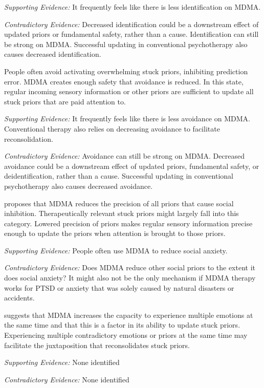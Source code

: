 \documentclass[11pt,oneside]{book}
\begin{document}
\begin{description}
    \textit{Supporting Evidence:} It frequently feels like there is less identification on MDMA.

    \textit{Contradictory Evidence:} Decreased identification could be a downstream effect of updated priors or fundamental safety, rather than a cause. Identification can still be strong on MDMA. Successful updating in conventional psychotherapy also causes decreased identification.

    \item[Decreased Avoidance of Activating Stuck Priors] People often avoid activating overwhelming stuck priors, inhibiting prediction error. MDMA creates enough safety that avoidance is reduced. In this state, regular incoming sensory information or other priors are sufficient to update all stuck priors that are paid attention to.
    
    \textit{Supporting Evidence:} It frequently feels like there is less avoidance on MDMA. Conventional therapy also relies on decreasing avoidance to facilitate reconsolidation.

    \textit{Contradictory Evidence:} Avoidance can still be strong on MDMA. Decreased avoidance could be a downstream effect of updated priors, fundamental safety, or deidentification, rather than a cause. Successful updating in conventional psychotherapy also causes decreased avoidance.

    \item[Reduced Precision of Social/Relational Priors] \textcite{carhart2019rebus} proposes that MDMA reduces the precision of all priors that cause social inhibition. Therapeutically relevant stuck priors might largely fall into this category. Lowered precision of priors makes regular sensory information precise enough to update the priors when attention is brought to those priors.
    
    \textit{Supporting Evidence:} People often use MDMA to reduce social anxiety.

    \textit{Contradictory Evidence:} Does MDMA reduce other social priors to the extent it does social anxiety? It might also not be the only mechanism if MDMA therapy works for PTSD or anxiety that was solely caused by natural disasters or accidents.
    
    \item[Increased Capacity to Experience Multiple Concurrent Emotions] \textcite{emilssonConcurrent} suggests that MDMA increases the capacity to experience multiple emotions at the same time and that this is a factor in its ability to update stuck priors. Experiencing multiple contradictory emotions or priors at the same time may facilitate the juxtaposition that reconsolidates stuck priors.

    \textit{Supporting Evidence:} None identified

    \textit{Contradictory Evidence:} None identified
\end{description}
\end{document}
